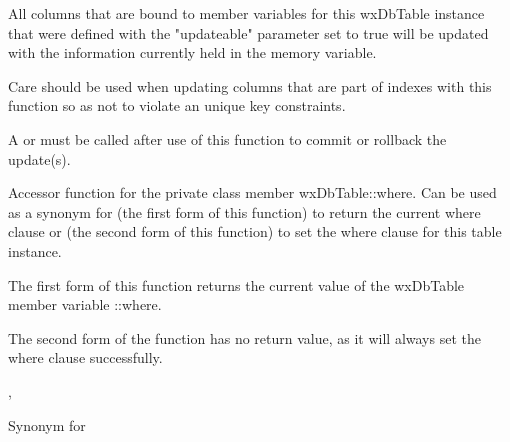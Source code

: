 All columns that are bound to member variables for this wxDbTable instance
that were defined with the "updateable" parameter set to true will be updated
with the information currently held in the memory variable.




Care should be used when updating columns that are part of indexes with
this function so as not to violate an unique key constraints.

A  or
 must be called after use of
this function to commit or rollback the update(s).

\label{wxdbtablewhere}



Accessor function for the private class member wxDbTable::where.  Can be used
as a synonym for 
(the first form of this function) to return the current where clause or
 (the second form
of this function) to set the where clause for this table instance.




The first form of this function returns the current value of the wxDbTable
member variable ::where.

The second form of the function has no return value, as it will always set
the where clause successfully.


,

\label{wxdbtableplusplus}


Synonym for 

